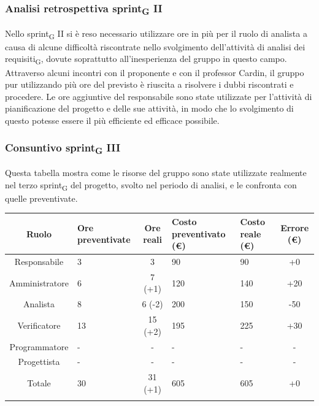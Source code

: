 \subsubsection{Analisi retrospettiva sprint\textsubscript{G} II}
Nello sprint\textsubscript{G} II si è reso necessario utilizzare ore in più per il ruolo di analista a causa di alcune difficoltà riscontrate nello svolgimento dell'attività di analisi dei requisiti\textsubscript{G}, dovute soprattutto all'inesperienza del gruppo in questo campo. Attraverso alcuni incontri con il proponente e con il professor Cardin, il gruppo pur utilizzando più ore del previsto è riuscita a risolvere i dubbi riscontrati e procedere. Le ore aggiuntive del responsabile sono state utilizzate per l'attività di pianificazione del progetto e delle sue attività, in modo che lo svolgimento di questo potesse essere il più efficiente ed efficace possibile. 

\newpage
\subsubsection{Consuntivo sprint\textsubscript{G} III}
Questa tabella mostra come le risorse del gruppo sono state utilizzate realmente nel terzo sprint\textsubscript{G} del progetto, svolto nel periodo di analisi, e le confronta con quelle preventivate.

\setlength\extrarowheight{5pt}
\begin{tabularx}{\textwidth}{|c|XcXX|c|}
	\hline
	\rowcolor{white}
	\textbf{Ruolo} & \textbf{Ore preventivate} & \textbf{Ore reali} & \textbf{Costo preventivato (€)} & \textbf{Costo reale (€)} & \textbf{Errore (€)} \\
	\hline
	Responsabile &3&3&90&90&+0\\
	Amministratore &6&7 (+1)&120&140&+20\\
	Analista &8&6 (-2)&200&150&-50\\
	Verificatore &13&15 (+2)&195&225&+30\\
	Programmatore &-&-&-&-&-\\
	Progettista &-&-&-&-&- \\
	\hline
	Totale &30&31 (+1)&605&605&+0\\
	\hline
	\rowcolor{white}
	\caption{Consuntivo ore e costi per ruolo del terzo sprint\textsubscript{G}}
\end{tabularx}
